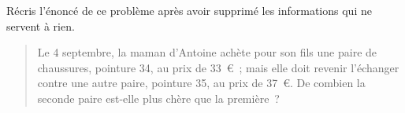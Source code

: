 Récris l'énoncé de ce problème après avoir supprimé les informations qui ne servent à rien.
\begin{quote}
Le 4 septembre, la maman d'Antoine achète pour son fils une paire de chaussures, pointure 34, au prix de 33~\textgreek{\euro} ; mais elle doit revenir l'échanger contre une autre paire, pointure 35, au prix de 37~\textgreek{\euro}. De combien la seconde paire est-elle plus chère que la première ?
\end{quote}